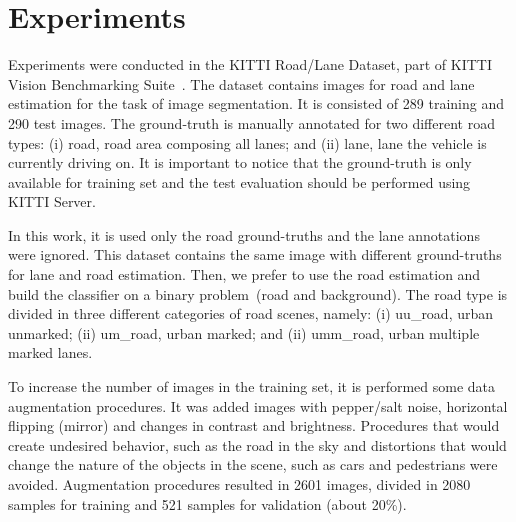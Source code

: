\section{Experiments}
\label{sec:experiments}

Experiments were conducted in the KITTI Road/Lane Dataset, part of KITTI Vision Benchmarking Suite~\cite{KITTI}. The dataset  contains  images for road and lane estimation for the task of image segmentation. It is consisted of 289 training and 290 test images. The ground-truth is manually annotated for two different road types: (i) road, road area composing all lanes; and (ii) lane, lane the vehicle is currently driving on. It is important to notice that the ground-truth is only available for training set and the test evaluation should be performed using KITTI Server.

In this work, it is used only the road ground-truths and the lane annotations were ignored. This dataset contains the same image with different ground-truths for lane and road estimation. Then, we prefer to use the road estimation and build the classifier on a binary problem~(road and background). The road type is divided in three different categories of road scenes, namely: (i) uu\_road, urban unmarked; (ii) um\_road, urban marked; and (ii) umm\_road, urban multiple marked lanes.  

{\color{green}{Rever lista de procedimentos de data augmentation}}

To increase the number of images in the training set, it is performed some data augmentation procedures. It was added images with pepper/salt noise, horizontal flipping (mirror) and  changes in contrast and brightness. Procedures that would create undesired behavior, such as the road in the sky and distortions that would change the nature of the objects in the scene, such as cars and pedestrians were avoided. Augmentation procedures resulted in 2601 images, divided in 2080 samples for training and 521 samples for validation (about 20\%). 


